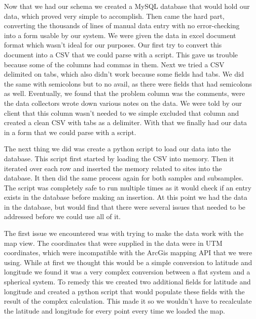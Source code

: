 \documentclass[10pt,draftclsnofoot,onecolumn]{IEEEtran}
\begin{document}
Now that we had our schema we created a MySQL database that would hold our data, which proved very simple to accomplish.
Then came the hard part, converting the thousands of lines of manual data entry with no error-checking into a form usable by our system.
We were given the data in excel document format which wasn't ideal for our purposes.
Our first try to convert this document into a CSV that we could parse with a script.
This gave us trouble because some of the columns had commas in them.
Next we tried a CSV delimited on tabs, which also didn't work because some fields had tabs.
We did the same with semicolons but to no avail, as there were fields that had semicolons as well.
Eventually, we found that the problem column was the comments, were the data collectors wrote down various notes on the data.
We were told by our client that this column wasn't needed to we simple excluded that column and created a clean CSV with tabs as a delimiter.
With that we finally had our data in a form that we could parse with a script.

The next thing we did was create a python script to load our data into the database.
This script first started by loading the CSV into memory.
Then it iterated over each row and inserted the memory related to sites into the database.
It then did the same process again for both samples and subsamples.
The script was completely safe to run multiple times as it would check if an entry exists in the database before making an insertion.
At this point we had the data in the database, but would find that there were several issues that needed to be addressed before we could use all of it.

The first issue we encountered was with trying to make the data work with the map view.
The coordinates that were supplied in the data were in UTM coordinates, which were incompatible with the ArcGis mapping API that we were using.
While at first we thought this would be a simple conversion to latitude and longitude we found it was a very complex conversion between a flat system and a spherical system.
To remedy this we created two additional fields for latitude and longitude and created a python script that would populate these fields with the result of the complex calculation.
This made it so we wouldn't have to recalculate the latitude and longitude for every point every time we loaded the map.
\end{document}
